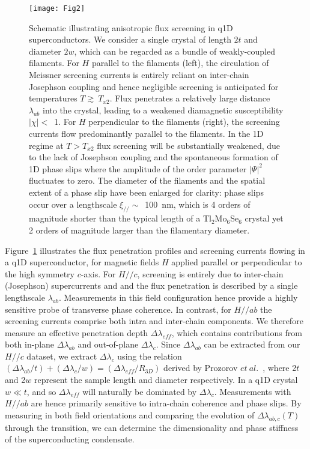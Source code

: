 \documentclass[prb,twocolumn,showpacs,preprintnumbers,amsmath,amssymb,floatfix,groupedaddress,superscriptaddress,aps,10pt]{revtex4-1}
\newcommand{\Tl}{Tl$_2$Mo$_6$Se$_6$}
\begin{document}
\begin{figure}[tbp]
	\centering 
	\texttt{[image: Fig2]}
	\caption{\label{Fig2} Schematic illustrating anisotropic flux screening in q1D superconductors.  We consider a single crystal of length $2t$ and diameter $2w$, which can be regarded as a bundle of weakly-coupled filaments.  For $H$ parallel to the filaments (left), the circulation of Meissner screening currents is entirely reliant on inter-chain Josephson coupling and hence negligible screening is anticipated for temperatures $T\gtrsim~T_{x2}$.  Flux penetrates a relatively large distance $\lambda_{ab}$ into the crystal, leading to a weakened diamagnetic susceptibility $\left|\chi\right|<$~1.  For $H$ perpendicular to the filaments (right), the screening currents flow predominantly parallel to the filaments.  In the 1D regime at $T>T_{x2}$ flux screening will be substantially weakened, due to the lack of Josephson coupling and the spontaneous formation of 1D phase slips where the amplitude of the order parameter $\left|\Psi\right|^2$ fluctuates to zero.  The diameter of the filaments and the spatial extent of a phase slip have been enlarged for clarity: phase slips occur over a lengthscale $\xi_{/\!/}\sim$~100~nm, which is 4 orders of magnitude shorter than the typical length of a {\Tl} crystal yet 2 orders of magnitude larger than the filamentary diameter.}
\end{figure} 

Figure~\ref{Fig2} illustrates the flux penetration profiles and screening currents flowing in a q1D superconductor, for magnetic fields $H$ applied parallel or perpendicular to the high symmetry $c$-axis.  For $H/\!/c$, screening is entirely due to inter-chain (Josephson) supercurrents and and the flux penetration is described by a single lengthscale $\lambda_{ab}$.  Measurements in this field configuration hence provide a highly sensitive probe of transverse phase coherence.  In contrast, for $H/\!/ab$ the screening currents comprise both intra and inter-chain components.  We therefore measure an effective penetration depth $\Delta$$\lambda_{eff}$, which contains contributions from both in-plane $\Delta\lambda_{ab}$ and out-of-plane $\Delta\lambda_{c}$.  Since $\Delta\lambda_{ab}$ can be extracted from our $H/\!/c$ dataset, we extract $\Delta\lambda_{c}$ using the relation $(\Delta\lambda_{ab}/t)+(\Delta\lambda_{c}/w)=(\Delta\lambda_{eff}/R_{3D})$ derived by Prozorov $et~al.$~\cite{Prozorov2011}, where 2$t$ and 2$w$ represent the sample length and diameter respectively.  In a q1D crystal $w \ll t$, and so $\Delta\lambda_{eff}$ will naturally be dominated by $\Delta\lambda_{c}$.  Measurements with $H/\!/ab$ are hence primarily sensitive to intra-chain coherence and phase slips.  By measuring in both field orientations and comparing the evolution of $\Delta\lambda_{ab,c}(T)$ through the transition, we can determine the dimensionality and phase stiffness of the superconducting condensate.  
\end{document}
